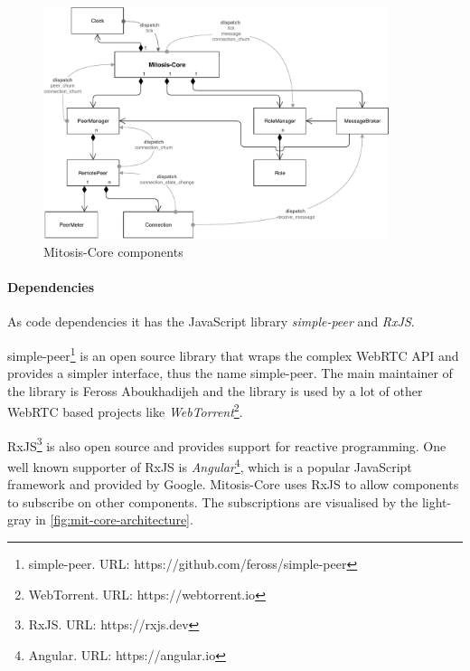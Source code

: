 \begin{figure}
\centering
\vspace{15cm}
\includegraphics[width=0.9\textwidth]{graphics/implementation/mitosis-architecture.pdf}
\caption{Mitosis-Core components}
\label{fig:mit-core-architecture}
\end{figure}

\paragraph{Dependencies}
As code dependencies it has the JavaScript library \textit{simple-peer} and \textit{RxJS}. 

simple-peer\footnote{simple-peer. URL: {https://github.com/feross/simple-peer}} is an open source library that wraps the complex WebRTC API and provides a simpler interface, thus the name simple-peer.
The main maintainer of the library is Feross Aboukhadijeh and the library is used by a lot of other WebRTC based projects like \textit{WebTorrent}\footnote{WebTorrent. URL: {https://webtorrent.io}}.

RxJS\footnote{RxJS. URL: {https://rxjs.dev}} is also open source and provides support for reactive programming. One well known supporter of RxJS is \textit{Angular}\footnote{Angular. URL: {https://angular.io}}, which is a popular JavaScript framework and provided by Google.
Mitosis-Core uses RxJS to allow components to subscribe on other components. The subscriptions are visualised by the light-gray  in \vref{fig:mit-core-architecture}.
